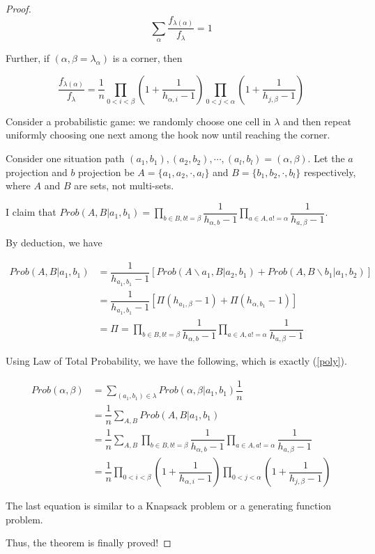 \documentclass[12pt]{article}
\theoremstyle{definition}
\begin{document}
\begin{proof}
	\begin{equation*}
		\sum\limits_{\alpha}\dfrac{f_{\lambda(\alpha)}}{f_{\lambda}} = 1
	\end{equation*}
	
	Further, if $(\alpha, \beta = \lambda_\alpha)$ is a corner, then
	
	\begin{equation} \label{poly}
		\dfrac{f_{\lambda(\alpha)}}{f_{\lambda}} = \dfrac{1}{n}\prod_{0 < i < \beta}(1+\dfrac{1}{h_{\alpha, i} - 1})\prod_{0 < j < \alpha}(1+\dfrac{1}{h_{j, \beta} - 1})
	\end{equation}
	
	Consider a probabilistic game: we randomly choose one cell in $\lambda$ and then repeat uniformly choosing one next among the hook now until reaching the corner. 
	
	Consider one situation path $(a_1, b_1), (a_2, b_2), \cdots, (a_l, b_l) = (\alpha, \beta)$. Let the $a$ projection and $b$ projection be $A = \{a_1, a_2, \cdot, a_l\}$ and $B = \{b_1, b_2, \cdot, b_l\}$ respectively, where $A$ and $B$ are sets, not multi-sets.

	I claim that $Prob(A, B | a_1, b_1) = \prod\limits_{b \in B, b != \beta}\dfrac{1}{h_{\alpha, b} - 1}\prod\limits_{a \in A, a != \alpha}\dfrac{1}{h_{a, \beta} - 1}$.
	
	By deduction, we have 
	
	\begin{align*}
		Prob(A, B | a_1, b_1) &= \dfrac{1}{h_{a_1,b_1} - 1}\left[Prob(A \backslash a_1, B | a_2, b_1) + Prob(A, B \backslash b_1 | a_1, b_2)\right] \\
		&= \dfrac{1}{h_{a_1,b_1} - 1}\left[\Pi(h_{a_1,\beta} - 1) + \Pi(h_{\alpha, b_1} - 1) \right] \\
		&= \Pi = \prod\limits_{b \in B, b != \beta}\dfrac{1}{h_{\alpha, b} - 1}\prod\limits_{a \in A, a != \alpha}\dfrac{1}{h_{a, \beta} - 1}
	\end{align*}
	
	Using Law of Total Probability, we have the following, which is exactly (\ref{poly}).
	
	\begin{align*}
		Prob(\alpha, \beta) &= \sum\limits_{(a_1,b_1) \in \lambda}Prob(\alpha, \beta | a_1, b_1)\dfrac{1}{n} \\
		&= \dfrac{1}{n}\sum\limits_{A,B}Prob(A, B|a_1,b_1) \\
		&= \dfrac{1}{n}\sum\limits_{A,B}\prod\limits_{b \in B, b != \beta}\dfrac{1}{h_{\alpha, b} - 1}\prod\limits_{a \in A, a != \alpha}\dfrac{1}{h_{a, \beta} - 1} \\
		&= \dfrac{1}{n}\prod_{0 < i < \beta}(1+\dfrac{1}{h_{\alpha, i} - 1})\prod_{0 < j < \alpha}(1+\dfrac{1}{h_{j, \beta} - 1})
	\end{align*}
	
	The last equation is similar to a Knapsack problem or a generating function problem.
	
	Thus, the theorem is finally proved!
	
\end{proof}

	\newpage
	
	
	
\end{document}
